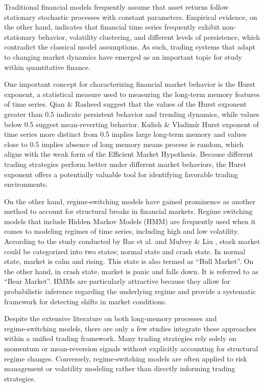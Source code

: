 \documentclass[12pt]{article}
\begin{document}
Traditional financial models frequently assume that asset returns follow stationary stochastic processes with constant parameters. Empirical evidence, on the other hand, indicates that financial time series frequently exhibit non-stationary behavior, volatility clustering, and different levels of persistence, which contradict the classical model assumptions. As such, trading systems that adapt to changing market dynamics have emerged as an important topic for study within quantitative finance.

One important concept for characterizing financial market behavior is the Hurst exponent, a statistical measure used to measuring the long-term memory features of time series. Qian \& Rasheed \cite{qian2004} suggest that the values of the Hurst exponent greater than 0.5 indicate persistent behavior and trending dynamics, while values below 0.5 suggest mean‑reverting behavior. Kulish \& Vladimír \cite{kulish2016} Hurst exponent of time series more distinct from 0.5 implies large long-term memory and values close to 0.5 implies absence of long memory means process is random, which aligns with the weak form of the Efficient Market Hypothesis. Because different trading strategies perform better under different market behaviors, the Hurst exponent offers a potentially valuable tool for identifying favorable trading environments.

On the other hand, regime‑switching models have gained prominence as another method to account for structural breaks in financial markets. Regime switching models that include Hidden Markov Models (HMM) are frequently used when it comes to modeling regimes of time series, including high and low volatility. According to the study conducted by Bae et al. \cite{bae2014} and Mulvey \& Liu \cite{mulvey2016}, stock market could be categorized into two states; normal state and crash state. In normal state, market is calm and rising. This state is also termed as “Bull Market”. On the other hand, in crash state, market is panic and falls down. It is referred to as “Bear Market”. HMMs are particularly attractive because they allow for probabilistic inference regarding the underlying regime and provide a systematic framework for detecting shifts in market conditions.

Despite the extensive literature on both long‑memory processes and regime‑switching models, there are only a few studies integrate these approaches within a unified trading framework. Many trading strategies rely solely on momentum or mean‑reversion signals without explicitly accounting for structural regime changes. Conversely, regime‑switching models are often applied to risk management or volatility modeling rather than directly informing trading strategies.
\end{document}
